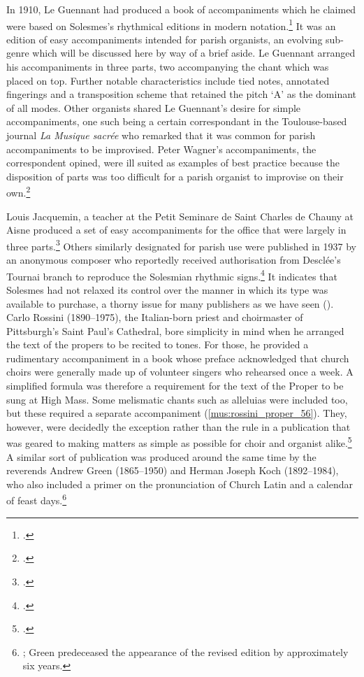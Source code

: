 In 1910, Le Guennant had produced a book of accompaniments which he claimed were based on Solesmes's rhythmical editions in modern notation.\footcite[p.~b]{LeGuennantVademecumparoissial1910}
It was an edition of easy accompaniments intended for parish organists, an evolving sub-genre which will be discussed here by way of a brief aside.
Le Guennant arranged his accompaniments in three parts, two accompanying the chant which was placed on top.
Further notable characteristics include tied notes, annotated fingerings and a transposition scheme that retained the pitch `A' as the dominant of all modes.
Other organists shared Le Guennant's desire for simple accompaniments, one such being a certain correspondant in the Toulouse-based journal \emph{La Musique sacrée} who remarked that it was common for parish accompaniments to be improvised.
Peter Wagner's accompaniments, the correspondent opined, were ill suited as examples of best practice because the disposition of parts was too difficult for a parish organist to improvise on their own.\footcite[47]{T.proposaccompagnementplainchant1911}

Louis Jacquemin, a teacher at the Petit Seminare de Saint Charles de Chauny at Aisne produced a set of easy accompaniments for the office that were largely in three parts.\footcites[14]{JacqueminAccompagnementsnouveauxtres1914}[Reproduced in][145]{Parisotaccompagnementmodalchant1914}
Others similarly designated for parish use were published in 1937 by an anonymous composer who reportedly received authorisation from Desclée's Tournai branch to reproduce the Solesmian rhythmic signs.\footcite[3]{PratiqueKyrialeparoissialaccompagnement1937}
It indicates that Solesmes had not relaxed its control over the manner in which its type was available to purchase, a thorny issue for many publishers as we have seen ().
Carlo Rossini (1890--1975), the Italian-born priest and choirmaster of Pittsburgh's Saint Paul's Cathedral, bore simplicity in mind when he arranged the text of the propers to be recited to tones.
For those, he provided a rudimentary accompaniment in a book whose preface acknowledged that church choirs were generally made up of volunteer singers who rehearsed once a week.
A simplified formula was therefore a requirement for the text of the Proper to be sung at High Mass.
Some melismatic chants such as alleluias were included too, but these required a separate accompaniment (\cref{mus:rossini_proper_56}).
They, however, were decidedly the exception rather than the rule in a publication that was geared to making matters as simple as possible for choir and organist alike.\footcite[unpaginated front matter, p.~56]{RossiniProperMassEntire1957}
A similar sort of publication was produced around the same time by the reverends Andrew Green (1865--1950) and Herman Joseph Koch (1892--1984), who also included a primer on the pronunciation of Church Latin and a calendar of feast days.\footnote{\cite[16--17]{GreenCompleteProperMass1956}; Green predeceased the appearance of the revised edition by approximately six years.}

